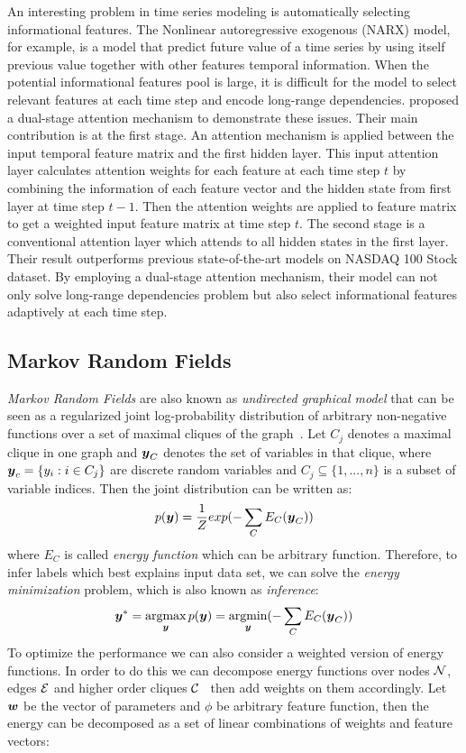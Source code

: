 \documentclass[sigconf, anonymous, review]{acmart}
\renewcommand{\citename}{\citet}
\renewcommand{\cite}{\citep}
\begin{document}
An interesting problem in time series modeling is automatically
selecting informational features. The Nonlinear autoregressive
exogenous (NARX) model, for example, is a model that predict
future value of a time series by using itself previous value
together with other features temporal information. When the
potential informational features pool is large, it is difficult
for the model to select relevant features at each time step and
encode long-range dependencies. \citename{qin2017dual} proposed a
dual-stage attention mechanism to demonstrate these issues. Their
main contribution is at the first stage. An attention mechanism
is applied between the input temporal feature matrix and the
first hidden layer. This input attention layer calculates
attention weights for each feature at each time step $t$ by
combining the information of each feature vector and the hidden
state from first layer at time step $t-1$. Then the attention
weights are applied to feature matrix to get a weighted input
feature matrix at time step $t$. The second stage is a
conventional attention layer which attends to all hidden states
in the first layer. Their result outperforms previous
state-of-the-art models on NASDAQ 100 Stock dataset. By employing
a dual-stage attention mechanism, their model can not only solve
long-range dependencies problem but also select informational
features adaptively at each time step.

\subsection{Markov Random Fields}
\label{sec:MRF}
\emph{Markov Random Fields} are also known as \emph{undirected
  graphical model} that can be seen as a regularized joint
log-probability distribution of arbitrary non-negative functions
over a set of maximal cliques of the
graph~\cite{bishop:2006:PRML}. Let $C_j$ denotes a maximal clique
in one graph and ${\boldsymbol{y}}_C$ denotes the set of variables in that
clique, where ${\boldsymbol{y}}_c=\{y_i:i\in C_j\}$ are discrete random
variables and $C_j\subseteq \{1,...,n\}$ is a subset of variable
indices. Then the joint distribution can be written as:
\begin{align}
  \label{eq:energyfunction_init}
  p({\boldsymbol{y}})=\frac{1}{Z}exp(-\sum_{C}{E_C({\boldsymbol{y}}_C)})
\end{align}
\noindent where $E_C$ is called \emph{energy function} which can
be arbitrary function. Therefore, to infer labels which best
explains input data set, we can solve the \emph{energy
  minimization} problem, which is also known as \emph{inference}:
\begin{align}
  \label{eq:inference_init}
  {\boldsymbol{y}}^*=\mathop{\textrm{argmax}}_{{\boldsymbol{y}}}p({\boldsymbol{y}})=\mathop{\textrm{argmin}}_{{\boldsymbol{y}}}(-\sum_{C}{E_C({\boldsymbol{y}}_C)})
\end{align}
To optimize the performance we can also consider a weighted
version of energy functions. In order to do this we can decompose
energy functions over nodes ${\cal N}$, edges ${\cal E}$ and higher order
cliques ${\cal C}$~\cite{Szummer:ECCV08} then add weights on them
accordingly. Let ${\boldsymbol{w}}$ be the vector of parameters and $\phi$ be
arbitrary feature function, then the energy can be decomposed as
a set of linear combinations of weights and feature vectors:
\end{document}
